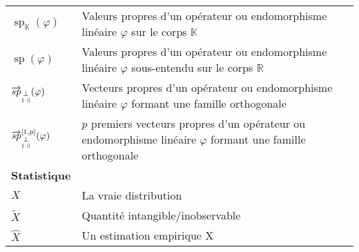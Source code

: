 \begin{table}[H]
\begin{tabularx}{\textwidth}{lX}
		\midrule
		$\operatorname{sp}_{\mathds K}(\varphi)$                         & Valeurs propres d'un opérateur ou endomorphisme linéaire $\varphi$ sur le corps $\mathds K$                                                                                                                                       \\
		$\operatorname{sp}(\varphi)$                                     & Valeurs propres d'un opérateur ou endomorphisme linéaire $\varphi$ sous-entendu sur le corps $\mathds R$                                                                                                                          \\
		$\overrightarrow{sp}_{\underset{\Vert \cdot \Vert}{\perp}}(\varphi)$                    & Vecteurs propres d'un opérateur ou endomorphisme linéaire $\varphi$ formant une famille orthogonale                                                                                                                               \\
		$\overrightarrow{sp}_{\underset{\Vert \cdot \Vert}{\perp}}^{[1,p]}(\varphi)$            & $p$ premiers vecteurs propres d'un opérateur ou endomorphisme linéaire $\varphi$ formant une famille orthogonale                                                                                                                  \\
		\midrule
		\textbf{Statistique}                                             &                                                                                                                                                                                                                                   \\
		\midrule
		$X$                                                              & La \og vraie \fg distribution                                                                                                                                                                                                     \\
		$\widetilde{X}$                                                  & Quantité intangible/inobservable                                                                                                                                                                                                  \\
		$\widehat{X}$                                                    & Un estimation empirique X                                                                                                                                                                                                         \\

\end{tabularx}
\end{table}
